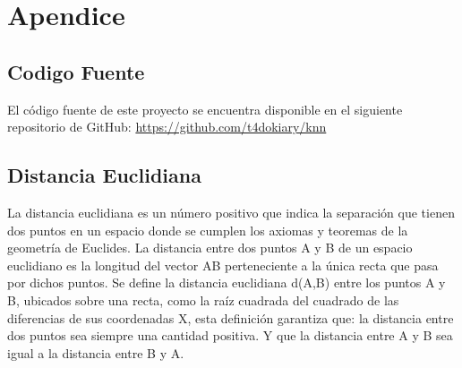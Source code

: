 \section {Apendice} \label{sec:Apendice}
\subsection{Codigo Fuente} \label{subsec:Codigo Fuente}

El código fuente de este proyecto se encuentra disponible en el siguiente repositorio de GitHub: \href{https://github.com/t4dokiary/knn}{https://github.com/t4dokiary/knn}

\subsection{Distancia Euclidiana} \label{subsec:Distancia Euclidiana}

La distancia euclidiana es un número positivo que indica la separación que tienen dos puntos en un
espacio donde se cumplen los axiomas y teoremas de la geometría de Euclides.
La distancia entre dos puntos A y B de un espacio euclidiano es la longitud del vector AB
perteneciente a la única recta que pasa por dichos puntos.
Se define la distancia euclidiana d(A,B) entre los puntos A y B, ubicados sobre una recta, como la
raíz cuadrada del cuadrado de las diferencias de sus coordenadas X, esta definición garantiza que:
la distancia entre dos puntos sea siempre una cantidad positiva. Y que la distancia entre A y B sea
igual a la distancia entre B y A.

